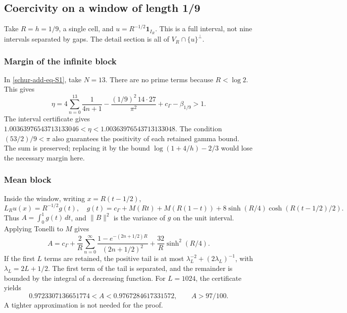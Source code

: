 \subsection{Coercivity on a window of length 1/9}
\label{schur-add-sub-248}

Take \(R=h=1/9\), a single cell, and \(u=R^{-1/2}\mathbf1_{I_R}\).
This is a full interval, not nine intervals separated by gaps. The detail
section is all of \(V_R\cap\{u\}^{\perp}\).

\subsubsection{Margin of the infinite block}
\label{schur-add-sub-254}

In \eqref{schur-add-eq-S1}, take \(N=13\). There are no prime terms because
\(R<\log2\). This gives
\begin{equation}
\eta=4\sum_{n=0}^{13}\frac1{4n+1}
-\frac{(1/9)^2\,14\cdot27}{\pi^2}+c_\Gamma-\beta_{1/9}>1.
\label{schur-add-eq-S9}
\end{equation}
The interval certificate gives
\(1.00363976543713133046<\eta<1.00363976543713133048\).
The condition \((53/2)/9<\pi\) also guarantees the positivity of
each retained gamma bound. The sum is preserved; replacing it by the
bound \(\log(1+4/h)-2/3\) would lose the necessary margin here.

\subsubsection{Mean block}
\label{schur-add-sub-269}

Inside the window, writing \(x=R(t-1/2)\),
\begin{equation}
L_Ru(x)=R^{-1/2}g(t),\quad
g(t)=c_\Gamma+M(Rt)+M(R(1-t))
+8\sinh(R/4)\cosh(R(t-1/2)/2).
\label{schur-add-display-22}
\end{equation}
Thus \(A=\int_0^1g(t)\,dt\), and \(\|B\|^2\) is the variance
of \(g\) on the unit interval. Applying Tonelli to \(M\) gives
\begin{equation}
A=c_\Gamma+\frac2R\sum_{n=0}^\infty
\frac{1-e^{-(2n+1/2)R}}{(2n+1/2)^2}
+\frac{32}R\sinh^2(R/4).
\label{schur-add-eq-S10}
\end{equation}
If the first \(L\) terms are retained, the positive tail is at
most \(\lambda_L^{-2}+(2\lambda_L)^{-1}\), with
\(\lambda_L=2L+1/2\). The first term of the tail is separated, and the
remainder is bounded by the integral of a decreasing function. For
\(L=1024\), the certificate yields
\begin{equation}
0.9723307136651774<A<0.9767284617331572,
\qquad A>97/100.
\label{schur-add-eq-S11}
\end{equation}
A tighter approximation is not needed for the proof.

